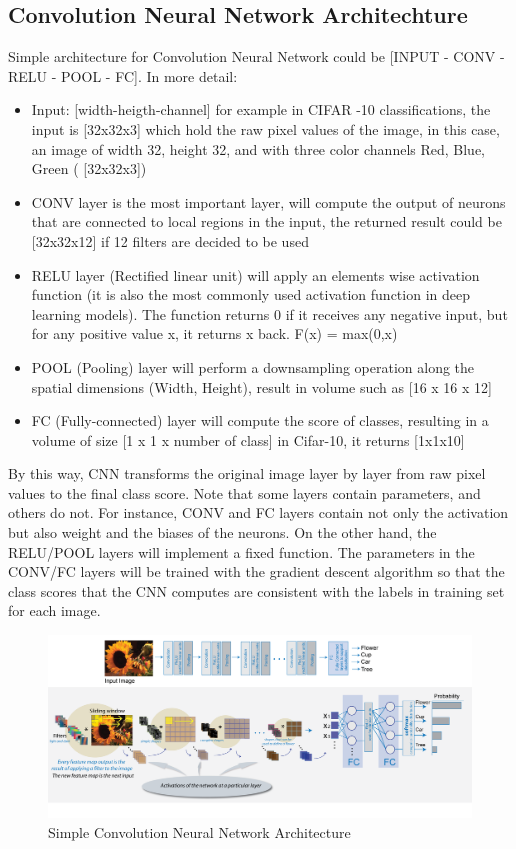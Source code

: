 \subsection{Convolution Neural Network Architechture}
Simple architecture for Convolution Neural Network could be [INPUT - CONV - RELU - POOL - FC]. In more detail:

\begin{itemize}
	\item Input: [width-heigth-channel] for example in CIFAR -10 classifications, the input is [32x32x3] which hold the raw pixel values of the image, in this case, an image of width 32, height 32, and with three color channels Red, Blue, Green ( [32x32x3])
	\item CONV layer is the most important layer, will compute the output of neurons that are connected to local regions in the input, the returned result could be [32x32x12] if 12 filters are decided to be used 
	\item RELU layer (Rectified linear unit) will apply an elements wise activation function (it is also the most commonly used activation function in deep learning models). The function returns 0 if it receives any negative input, but for any positive value x, it returns x back. F(x) = max(0,x)\\
	\item POOL (Pooling) layer will perform a downsampling operation along the spatial dimensions (Width, Height), result in volume such as [16 x 16 x 12]
	\item FC (Fully-connected) layer will compute the score of classes, resulting in a volume of size [1 x 1 x number of class] in Cifar-10, it returns [1x1x10]
\end{itemize}
By this way, CNN transforms the original image layer by layer from raw pixel values to the final class score. Note that some layers contain parameters, and others do not. For instance, CONV and FC layers contain not only the activation but also weight and the biases of the neurons. On the other hand, the RELU/POOL layers will implement a fixed function. The parameters in the CONV/FC layers will be trained with the gradient descent algorithm so that the class scores that the CNN computes are consistent with the labels in training set for each image.\\
\begin{center}
  \begin{figure}[H]
  \centering
  \includegraphics[width=1\columnwidth]{images/chap2/Intro_CNN.png}
  \caption{Simple Convolution Neural Network Architecture}
  \label{chap2:CNN arch}
  \end{figure}
\end{center}

